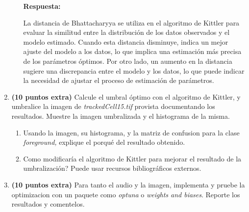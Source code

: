 \documentclass[spanish]{article}
\begin{document}
\begin{enumerate}
\begin{enumerate}
\vspace{5px}

\par \textbf{Respuesta:}

\vspace{5px}

\par La distancia de Bhattacharyya se utiliza en el algoritmo de Kittler para evaluar la similitud entre la distribución de los datos observados y el modelo estimado. Cuando esta distancia disminuye, indica un mejor ajuste del modelo a los datos, lo que implica una estimación más precisa de los parámetros óptimos. Por otro lado, un aumento en la distancia sugiere una discrepancia entre el modelo y los datos, lo que puede indicar la necesidad de ajustar el proceso de estimación de parámetros.

\end{enumerate}
\item \textbf{(10 puntos extra)} Calcule el umbral óptimo con el algoritmo
de Kittler, y umbralice la imagen de \emph{trackedCell15.tif} provista
documentando los resultados. Muestre la imagen umbralizada y el histograma
de la misma. 
\begin{enumerate}
\item Usando la imagen, su histograma, y la matriz de confusion para la
clase \emph{foreground,} explique el porqué del resultado obtenido.
\item Como modificaría el algoritmo de Kittler para mejorar el resultado
de la umbralización? Puede usar recursos bibliográficos externos.
\end{enumerate}
\item \textbf{(10 puntos extra)} Para tanto el audio y la imagen, implementa
y pruebe la optimizacion con un paquete como \emph{optuna }o \emph{weights
and biases}. Reporte los resultados y comentelos. 
\end{enumerate}


\end{document}
